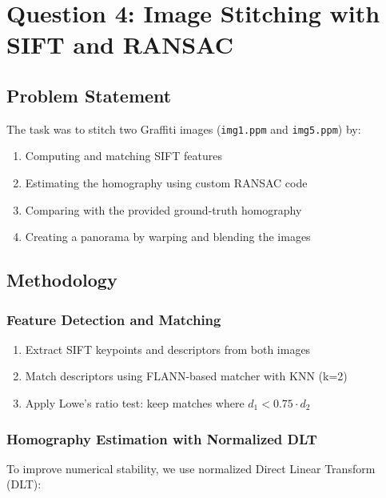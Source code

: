 \documentclass[11pt,a4paper]{article}
\begin{document}
\section{Question 4: Image Stitching with SIFT and RANSAC}

\subsection{Problem Statement}
The task was to stitch two Graffiti images (\texttt{img1.ppm} and \texttt{img5.ppm}) by:
\begin{enumerate}
    \item Computing and matching SIFT features
    \item Estimating the homography using custom RANSAC code
    \item Comparing with the provided ground-truth homography
    \item Creating a panorama by warping and blending the images
\end{enumerate}

\subsection{Methodology}

\subsubsection{Feature Detection and Matching}
\begin{enumerate}
    \item Extract SIFT keypoints and descriptors from both images
    \item Match descriptors using FLANN-based matcher with KNN (k=2)
    \item Apply Lowe's ratio test: keep matches where $d_1 < 0.75 \cdot d_2$
\end{enumerate}

\subsubsection{Homography Estimation with Normalized DLT}
To improve numerical stability, we use normalized Direct Linear Transform (DLT):
\end{document}
